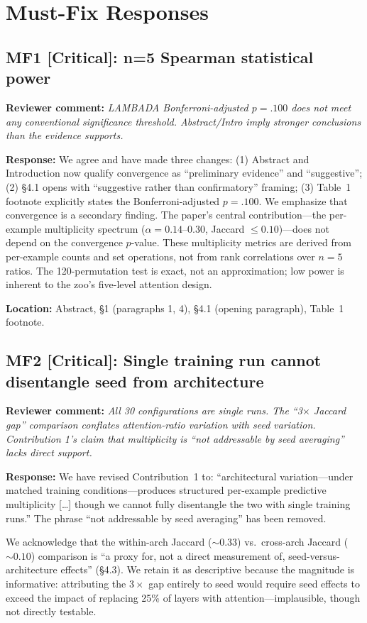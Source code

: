 \documentclass[11pt]{article}
\newcommand{\reviewer}[1]{\textcolor{reviewercolor}{\textbf{Reviewer comment:} \textit{#1}}}
\newcommand{\response}[1]{\textcolor{responsecolor}{\textbf{Response:} #1}}
\newcommand{\location}[1]{\textbf{Location:} #1}
\begin{document}
\section*{Must-Fix Responses}

\subsection*{MF1 [Critical]: n=5 Spearman statistical power}

\reviewer{LAMBADA Bonferroni-adjusted $p = .100$ does not meet any conventional significance threshold. Abstract/Intro imply stronger conclusions than the evidence supports.}

\response{We agree and have made three changes: (1) Abstract and Introduction now qualify convergence as ``preliminary evidence'' and ``suggestive''; (2) \S4.1 opens with ``suggestive rather than confirmatory'' framing; (3) Table~1 footnote explicitly states the Bonferroni-adjusted $p = .100$. We emphasize that convergence is a secondary finding. The paper's central contribution---the per-example multiplicity spectrum ($\alpha = 0.14$--$0.30$, Jaccard $\leq 0.10$)---does not depend on the convergence $p$-value. These multiplicity metrics are derived from per-example counts and set operations, not from rank correlations over $n = 5$ ratios. The 120-permutation test is exact, not an approximation; low power is inherent to the zoo's five-level attention design.}

\location{Abstract, \S1 (paragraphs 1, 4), \S4.1 (opening paragraph), Table~1 footnote.}

\subsection*{MF2 [Critical]: Single training run cannot disentangle seed from architecture}

\reviewer{All 30 configurations are single runs. The ``3$\times$ Jaccard gap'' comparison conflates attention-ratio variation with seed variation. Contribution 1's claim that multiplicity is ``not addressable by seed averaging'' lacks direct support.}

\response{We have revised Contribution~1 to: ``architectural variation---under matched training conditions---produces structured per-example predictive multiplicity [\ldots] though we cannot fully disentangle the two with single training runs.'' The phrase ``not addressable by seed averaging'' has been removed.}

We acknowledge that the within-arch Jaccard (${\sim}0.33$) vs.\ cross-arch Jaccard (${\sim}0.10$) comparison is ``a proxy for, not a direct measurement of, seed-versus-architecture effects'' (\S4.3). We retain it as descriptive because the magnitude is informative: attributing the $3\times$ gap entirely to seed would require seed effects to exceed the impact of replacing 25\% of layers with attention---implausible, though not directly testable.
\end{document}

